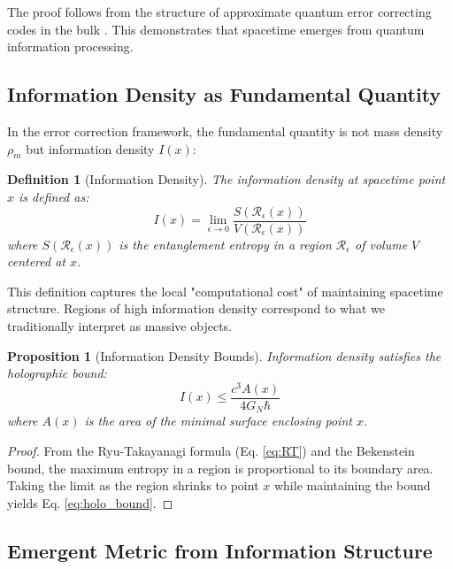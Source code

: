\documentclass[12pt,a4paper]{article}
\newtheorem{definition}[theorem]{Definition}
\newtheorem{proposition}[theorem]{Proposition}
\theoremstyle{remark}
\begin{document}
The proof follows from the structure of approximate quantum error correcting codes in the bulk \cite{Almheiri2015}. This demonstrates that spacetime emerges from quantum information processing.

\subsection{Information Density as Fundamental Quantity}

In the error correction framework, the fundamental quantity is not mass density $\rho_m$ but information density $I(x)$:

\begin{definition}[Information Density]
The information density at spacetime point $x$ is defined as:
\begin{equation}
I(x) = \lim_{\epsilon \to 0} \frac{S(\mathcal{R}_\epsilon(x))}{V(\mathcal{R}_\epsilon(x))}
\label{eq:info_density}
\end{equation}
where $S(\mathcal{R}_\epsilon(x))$ is the entanglement entropy in a region $\mathcal{R}_\epsilon$ of volume $V$ centered at $x$.
\end{definition}

This definition captures the local "computational cost" of maintaining spacetime structure. Regions of high information density correspond to what we traditionally interpret as massive objects.

\begin{proposition}[Information Density Bounds]
Information density satisfies the holographic bound:
\begin{equation}
I(x) \leq \frac{c^3 A(x)}{4G_N\hbar}
\label{eq:holo_bound}
\end{equation}
where $A(x)$ is the area of the minimal surface enclosing point $x$.
\end{proposition}

\begin{proof}
From the Ryu-Takayanagi formula (Eq. \ref{eq:RT}) and the Bekenstein bound, the maximum entropy in a region is proportional to its boundary area. Taking the limit as the region shrinks to point $x$ while maintaining the bound yields Eq. \ref{eq:holo_bound}.
\end{proof}

\subsection{Emergent Metric from Information Structure}
\end{document}
